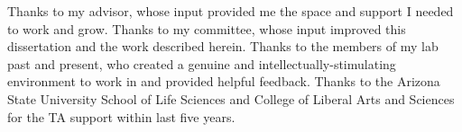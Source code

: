 Thanks to my advisor, whose input provided me the space and support I needed to work and grow. Thanks to my committee, whose input improved this dissertation and the work described herein. Thanks to the members of my lab past and present, who created a genuine and intellectually-stimulating environment to work in and provided helpful feedback. Thanks to the Arizona State University School of Life Sciences and College of Liberal Arts and Sciences for the TA support within last five years.